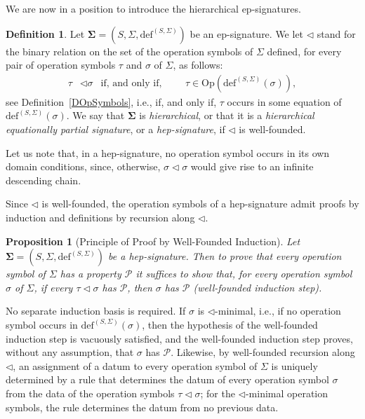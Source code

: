 \documentclass[a4paper, reqno]{amsbook}
\newcommand{\sig}[1]{\mathbf{#1}}             %
\theoremstyle{plain}
\newtheorem{proposition}[theorem]{Proposition}
\theoremstyle{definition}
\newtheorem{definition}[theorem]{Definition}
\begin{document}
We are now in a position to introduce the hierarchical ep-signatures.

\begin{definition}\label{DHepSig}
Let $\sig{\Sigma}=(S,\Sigma,\mathrm{def}^{(S,\Sigma)})$ be an ep-signature.
We let $\lhd$ stand for the binary relation on the set of the operation symbols of $\Sigma$ defined, for every pair of operation symbols $\tau$ and $\sigma$ of $\Sigma$, as follows:
\begin{align*}
\tau&\lhd\sigma
&\mbox{if, and only if,}&&
&\tau\in\mathrm{Op}\left(\mathrm{def}^{(S,\Sigma)}(\sigma)\right),
\end{align*}
see Definition~\ref{DOpSymbols}, i.e., if, and only if, $\tau$ occurs in some equation of $\mathrm{def}^{(S,\Sigma)}(\sigma)$.
We say that $\sig{\Sigma}$ is \emph{hierarchical}, or that it is a \emph{hierarchical equationally partial signature}, or a \emph{hep-signature}, if $\lhd$ is well-founded.
\end{definition}

Let us note that, in a hep-signature, no operation symbol occurs in its own domain conditions, since, otherwise, $\sigma\lhd\sigma$ would give rise to an infinite descending chain.

Since $\lhd$ is well-founded, the operation symbols of a hep-signature admit proofs by induction and definitions by recursion along $\lhd$.

\begin{proposition}[Principle of Proof by Well-Founded Induction]\label{PWellFoundedInduction}
Let $\sig{\Sigma}=(S,\Sigma,\mathrm{def}^{(S,\Sigma)})$ be a hep-signature.
Then to prove that every operation symbol of $\Sigma$ has a property $\mathcal{P}$ it suffices to show that, for every operation symbol $\sigma$ of $\Sigma$, if every $\tau\lhd\sigma$ has $\mathcal{P}$, then $\sigma$ has $\mathcal{P}$ (well-founded induction step).
\end{proposition}

No separate induction basis is required.
If $\sigma$ is $\lhd$-minimal, i.e., if no operation symbol occurs in $\mathrm{def}^{(S,\Sigma)}(\sigma)$, then the hypothesis of the well-founded induction step is vacuously satisfied, and the well-founded induction step proves, without any assumption, that $\sigma$ has $\mathcal{P}$.
Likewise, by well-founded recursion along $\lhd$, an assignment of a datum to every operation symbol of $\Sigma$ is uniquely determined by a rule that determines the datum of every operation symbol $\sigma$ from the data of the operation symbols $\tau\lhd\sigma$; for the $\lhd$-minimal operation symbols, the rule determines the datum from no previous data.
\end{document}
